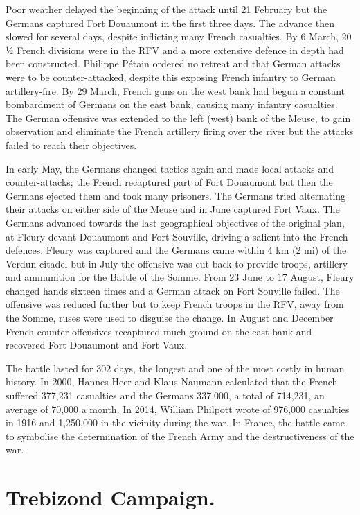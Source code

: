 \documentclass[a4paper,]{book}
\begin{document}
Poor weather delayed the beginning of the attack until 21 February but the Germans captured Fort Douaumont in the first three days. The advance then slowed for several days, despite inflicting many French casualties. By 6 March, ​20 1⁄2 French divisions were in the RFV and a more extensive defence in depth had been constructed. Philippe Pétain ordered no retreat and that German attacks were to be counter-attacked, despite this exposing French infantry to German artillery-fire. By 29 March, French guns on the west bank had begun a constant bombardment of Germans on the east bank, causing many infantry casualties. The German offensive was extended to the left (west) bank of the Meuse, to gain observation and eliminate the French artillery firing over the river but the attacks failed to reach their objectives.

In early May, the Germans changed tactics again and made local attacks and counter-attacks; the French recaptured part of Fort Douaumont but then the Germans ejected them and took many prisoners. The Germans tried alternating their attacks on either side of the Meuse and in June captured Fort Vaux. The Germans advanced towards the last geographical objectives of the original plan, at Fleury-devant-Douaumont and Fort Souville, driving a salient into the French defences. Fleury was captured and the Germans came within 4 km (2 mi) of the Verdun citadel but in July the offensive was cut back to provide troops, artillery and ammunition for the Battle of the Somme. From 23 June to 17 August, Fleury changed hands sixteen times and a German attack on Fort Souville failed. The offensive was reduced further but to keep French troops in the RFV, away from the Somme, ruses were used to disguise the change. In August and December French counter-offensives recaptured much ground on the east bank and recovered Fort Douaumont and Fort Vaux.

The battle lasted for 302 days, the longest and one of the most costly in human history. In 2000, Hannes Heer and Klaus Naumann calculated that the French suffered 377,231 casualties and the Germans 337,000, a total of 714,231, an average of 70,000 a month. In 2014, William Philpott wrote of 976,000 casualties in 1916 and 1,250,000 in the vicinity during the war. In France, the battle came to symbolise the determination of the French Army and the destructiveness of the war. 

\section{Trebizond Campaign.}
\end{document}
